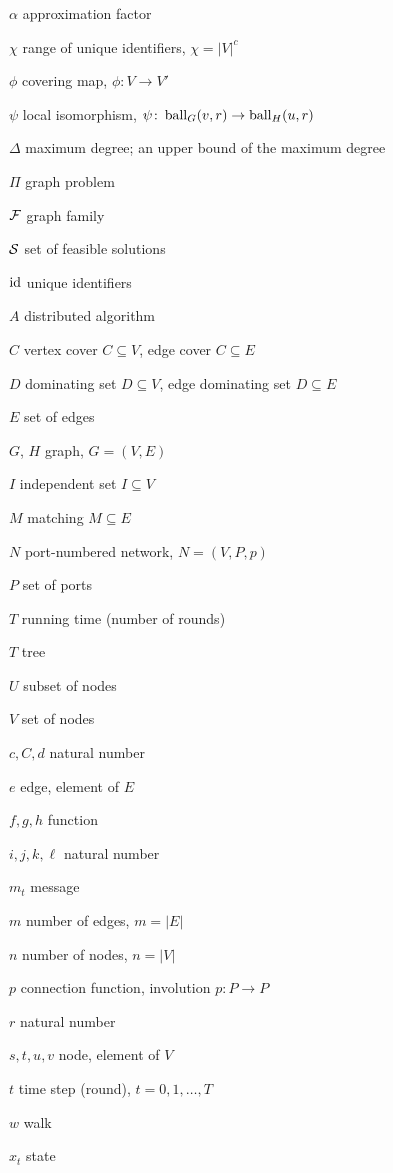 {\raggedright
\begin{notation}
    \item[$\alpha$] approximation factor
    \item[$\chi$] range of unique identifiers, $\chi = |V|^c$
    \item[$\phi$] covering map, $\phi \colon V \to V'$
    \item[$\psi$] local isomorphism, $\psi \colon \operatorname{ball}_G(v,r) \to \operatorname{ball}_H(u,r)$
    \item[$\Delta$] maximum degree; an upper bound of the maximum degree
    \item[$\Pi$] graph problem
    \item[$\mathcal{F}$] graph family
    \item[$\mathcal{S}$] set of feasible solutions
    \item[$\operatorname{id}$] unique identifiers
    \item[$A$] distributed algorithm
    \item[$C$] vertex cover $C \subseteq V$, edge cover $C \subseteq E$
    \item[$D$] dominating set $D \subseteq V$, edge dominating set $D \subseteq E$
    \item[$E$] set of edges
    \item[$G$, $H$] graph, $G = (V,E)$
    \item[$I$] independent set $I \subseteq V$
    \item[$M$] matching $M \subseteq E$
    \item[$N$] port-numbered network, $N = (V,P,p)$
    \item[$P$] set of ports
    \item[$T$] running time (number of rounds)
    \item[$T$] tree
    \item[$U$] subset of nodes
    \item[$V$] set of nodes
    \item[$c,C,d$] natural number
    \item[$e$] edge, element of $E$
    \item[$f,g,h$] function
    \item[$i,j,k,\ell$] natural number
    \item[$m_t$] message
    \item[$m$] number of edges, $m = |E|$
    \item[$n$] number of nodes, $n = |V|$
    \item[$p$] connection function, involution $p \colon P \to P$
    \item[$r$] natural number
    \item[$s,t,u,v$] node, element of $V$
    \item[$t$] time step (round), $t = 0, 1, \dotsc, T$
    \item[$w$] walk
    \item[$x_t$] state
\end{notation}}

